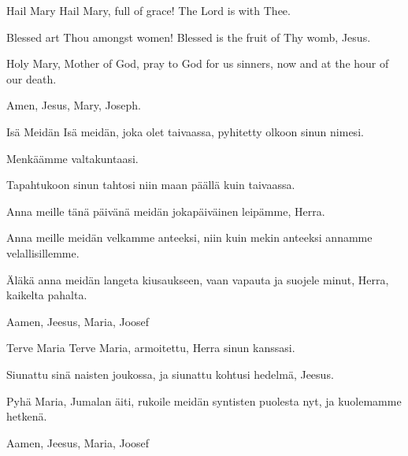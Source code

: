   \begin{passage}[EN]{Hail Mary}
    Hail Mary,
    full of grace!
    The Lord is with Thee.
    \par
    Blessed art Thou amongst women!
    Blessed is the fruit of Thy womb, Jesus.
    \par
    Holy Mary, Mother of God,
    pray to God for us sinners,
    now and at the hour of our death.
    \par
    Amen, Jesus, Mary, Joseph.
  \end{passage}
  \vspace{\fill}
  \hardbrk
  \vspace*{10ex} %
  \begin{passage}[FI]{Isä Meidän}
    Isä meidän, joka olet taivaassa,
    pyhitetty olkoon sinun nimesi.
    \par
    Menkäämme valtakuntaasi.
    \par
    Tapahtukoon sinun tahtosi niin
    maan päällä kuin taivaassa.
    \par
    Anna meille tänä päivänä meidän
    jokapäiväinen leipämme, Herra.
    \par
    Anna meille meidän velkamme anteeksi,
    niin kuin mekin anteeksi annamme velallisillemme.
    \par
    Äläkä anna meidän langeta kiusaukseen,
    vaan vapauta ja suojele minut,
    Herra, kaikelta pahalta.
    \par
    Aamen, Jeesus, Maria, Joosef
  \end{passage}
  \begin{passage}[FI]{Terve Maria}
    Terve Maria, armoitettu,
    Herra sinun kanssasi.
    \par
    Siunattu sinä naisten joukossa,
    ja siunattu kohtusi hedelmä, Jeesus.
    \par
    Pyhä Maria, Jumalan äiti, rukoile meidän
    syntisten puolesta nyt, ja kuolemamme hetkenä.
    \par
    Aamen, Jeesus, Maria, Joosef
  \end{passage}
  \vspace*{\fill}
\endsong


